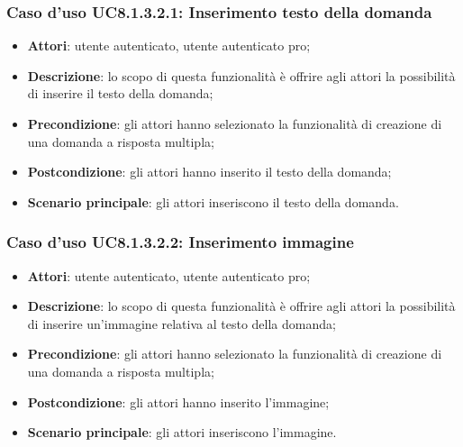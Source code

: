 \subsubsection{Caso d'uso UC8.1.3.2.1: Inserimento testo della domanda}
	\begin{itemize}
		\item
			\textbf{Attori}: utente autenticato, utente autenticato pro;
		\item		
			\textbf{Descrizione}: lo scopo di questa funzionalità è offrire agli attori la possibilità di inserire il testo della domanda;
		\item
			\textbf{Precondizione}: gli attori hanno selezionato la funzionalità di creazione di una domanda a risposta multipla; 
		\item
			\textbf{Postcondizione}: gli attori hanno inserito il testo della domanda;
		\item
			\textbf{Scenario principale}: gli attori inseriscono il testo della domanda. 
	 			
	\end{itemize}
	
\subsubsection{Caso d'uso UC8.1.3.2.2: Inserimento immagine}
	\begin{itemize}
		\item
			\textbf{Attori}: utente autenticato, utente autenticato pro;
		\item		
			\textbf{Descrizione}: lo scopo di questa funzionalità è offrire agli attori la possibilità di inserire un'immagine relativa al testo della domanda;
		\item
			\textbf{Precondizione}: gli attori hanno selezionato la funzionalità di creazione di una domanda a risposta multipla; 
		\item
			\textbf{Postcondizione}: gli attori hanno inserito l'immagine;
		\item
			\textbf{Scenario principale}: gli attori inseriscono l'immagine. 	
	\end{itemize}
	
	
